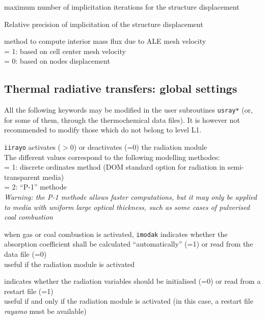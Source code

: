 {maximum number of implicitation iterations for the structure displacement}

{Relative precision of implicitation of the structure displacement }

{method to compute interior mass flux due to ALE mesh velocity\\
\hspace*{1.3cm} = 1: based on cell center mesh velocity\\
\hspace*{1.3cm} = 0: based on nodes displacement
}
\subsection{Thermal radiative transfers: global settings}

All the following keywords may be modified in the user subroutines
\texttt{usray*} (or, for some of them, through the thermochemical data files).
It is however not recommended to modify those which do not belong to
level L1.

{{\tt iirayo} activates ($>0$) or deactivates
(=0) the radiation module\\
The different values correspond to the following modelling methodes:\\
\hspace*{1.3cm} = 1: discrete ordinates method
(DOM standard option for radiation in semi-transparent media)\\
\hspace*{1.3cm} = 2: ``P-1'' methode\\
{\em Warning: the P-1 methode allows faster computations, but it
may only be applied to media with uniform large optical thickness, such as
some cases of pulverised coal combustion}}

{when gas or coal combustion is activated, {\tt imodak} indicates whether the
absorption coefficient shall be calculated ``automatically'' (=1) or read from
the data file (=0)\\
useful if the radiation module is activated}

{indicates whether the radiation variables should be initialised (=0) or read
from a restart file (=1)\\
useful if and only if the radiation module is activated (in this case, a
restart file {\em rayamo} must be available)}

